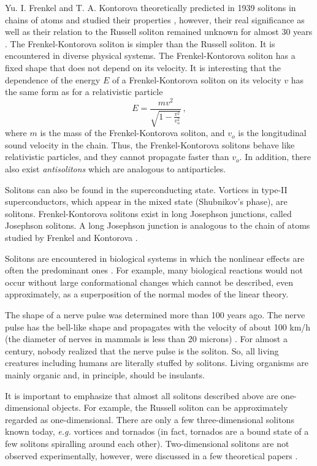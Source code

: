 Yu. I. Frenkel and T. A. Kontorova theoretically predicted in 1939 solitons in 
chains of atoms and studied their properties \cite{Frenkel}, however, their 
real significance as well as their relation to the Russell soliton remained 
unknown for almost 30 years \cite{Filippov}. The Frenkel-Kontorova soliton 
is simpler than the Russell soliton. It is encountered in diverse physical 
systems. The Frenkel-Kontorova soliton has a fixed shape that does not 
depend on its velocity. It is interesting that the dependence of the energy 
$E$ of a Frenkel-Kontorova soliton on its velocity $v$ has the same form 
as for a relativistic particle
	\[ E = \frac{mv^{2}}{\sqrt{1-\frac{v^{2}}{v_{o}^{2}}}} \, ,\]
where $m$ is the mass of the Frenkel-Kontorova soliton, and $v_{o}$ is the 
longitudinal sound velocity in the chain. Thus, the Frenkel-Kontorova 
solitons behave like relativistic particles, and they cannot propagate faster 
than $v_{o}$. In addition, there also exist {\em antisolitons} which are 
analogous to antiparticles.

Solitons can also be found in the superconducting state. Vortices in type-II 
superconductors, which appear in the mixed state (Shubnikov's phase), are 
solitons. Frenkel-Kontorova solitons exist in long Josephson junctions, 
called Josephson solitons. A long Josephson junction is analogous to the 
chain of atoms studied by Frenkel and Kontorova \cite{Filippov}.

Solitons are encountered in biological systems in which the nonlinear
effects are often the predominant ones \cite{Davydov1,Davydov3,biology}. 
For example, many biological reactions would not occur without large 
conformational changes which cannot be described, even approximately, as 
a superposition of the normal modes of the linear theory. 

The shape of a nerve pulse was determined more than 100 years ago.
The nerve pulse has the bell-like shape and propagates with the velocity
of about 100 km/h (the diameter of nerves in mammals is less than 20 
microns) \cite{Filippov}. For almost a century, nobody realized 
that the nerve pulse is the soliton. So, all living creatures including humans 
are literally stuffed by solitons. Living organisms are mainly organic and, 
in principle, should be insulants. 

It is important to emphasize that almost all solitons described above 
are one-dimensional objects. For example, the Russell soliton can be 
approximately regarded as one-dimensional. There are only a few 
three-dimensional solitons known today, {\em e.g.} vortices and tornados
(in fact, tornados are a bound state of a few solitons spiralling around 
each other). Two-dimensional solitons are not observed experimentally, 
however, were discussed in a few theoretical papers \cite{Filippov}.

